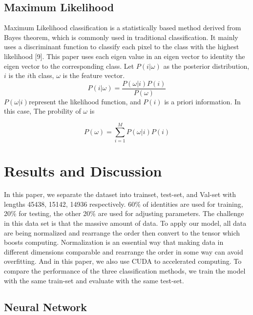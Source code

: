 \documentclass[runningheads]{llncs}
\begin{document}
\subsection{Maximum Likelihood}
Maximum Likelihood classification is a statistically based method derived from Bayes theorem, which is commonly used in traditional classification. It mainly uses a discriminant function to classify each pixel to the class with the highest likelihood [9]. This paper uses each eigen value in an eigen vector to identity the eigen vector to the corresponding class. Let $P(i|\omega)$ as the posterior distribution, $i$ is the $i$th class, $\omega$ is the feature vector.
\begin{equation}
	P(i|\omega)=\frac{P(\omega|i)P(i)}{P(\omega)}
\end{equation}
$P(\omega|i)$represent the likelihood function, and $P(i)$ is a priori information. In this case, The probility of $\omega$ is

\begin{equation}
	P(\omega)=\sum_{i=1}^{M}P(\omega|i)P(i)
\end{equation}

\section{Results and Discussion}
In this paper, we separate the dataset into trainset, test-set, and Val-set with lengths 45438, 15142, 14936 respectively. 60\% of identities are used for training, 20\% for testing, the other 20\% are used for adjusting parameters. The challenge in this data set is that the massive amount of data. To apply our model, all data are being normalized and rearrange the order then convert to the tensor which boosts computing. Normalization is an essential way that making data in different dimensions comparable and rearrange the order in some way can avoid overfitting. And in this paper, we also use CUDA to accelerated computing. To compare the performance of the three classification methods, we train the model with the same train-set and evaluate with the same test-set.

\subsection{Neural Network}
\end{document}
